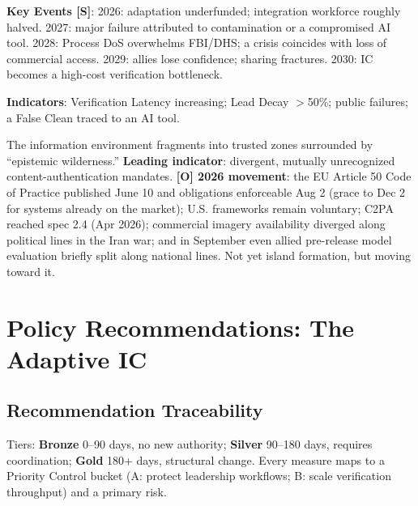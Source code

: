 \documentclass[11pt,letterpaper]{article}
\begin{document}
\begin{warnbox}
\textbf{Key Events [S]}: 2026: adaptation underfunded; integration workforce roughly halved. 2027: major failure attributed to contamination or a compromised AI tool. 2028: Process DoS overwhelms FBI/DHS; a crisis coincides with loss of commercial access. 2029: allies lose confidence; sharing fractures. 2030: IC becomes a high-cost verification bottleneck.

\textbf{Indicators}: Verification Latency increasing; Lead Decay $>$50\%; public failures; a False Clean traced to an AI tool.
\end{warnbox}

\begin{defbox}
The information environment fragments into trusted zones surrounded by ``epistemic wilderness.'' \textbf{Leading indicator}: divergent, mutually unrecognized content-authentication mandates. \textbf{[O] 2026 movement}: the EU Article 50 Code of Practice published June 10 and obligations enforceable Aug 2 (grace to Dec 2 for systems already on the market); U.S. frameworks remain voluntary; C2PA reached spec 2.4 (Apr 2026); commercial imagery availability diverged along political lines in the Iran war; and in September even allied pre-release model evaluation briefly split along national lines. Not yet island formation, but moving toward it.
\end{defbox}

\section{Policy Recommendations: The Adaptive IC}

\subsection{Recommendation Traceability}

Tiers: \textbf{Bronze} 0--90 days, no new authority; \textbf{Silver} 90--180 days, requires coordination; \textbf{Gold} 180+ days, structural change. Every measure maps to a Priority Control bucket (A: protect leadership workflows; B: scale verification throughput) and a primary risk.
\end{document}
